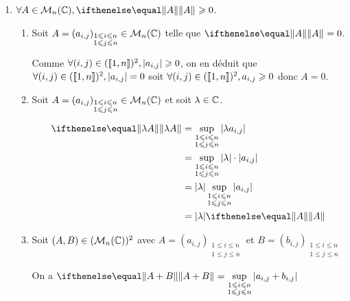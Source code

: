 \begin{enumerate}
    \item $\forall A\in\M_n(\CC),\norme{A}{} \geqslant 0$.
    \begin{enumerate}
        \item Soit $A=\left(a_{i,j}\right)_{\substack{1\leqslant i\leqslant n \\ 1 \leqslant j \leqslant n}}\in\mathcal{M}_n(\mathbb{C})$ telle que $\norme{A}{} = 0$.
        
        Comme $\forall (i,j) \in(\left\llbracket 1, n \right\rrbracket)^2,\vert a_{i,j}\vert \geqslant 0$, on en déduit que $\forall (i,j) \in(\left\llbracket 1, n \right\rrbracket)^2,\vert a_{i,j}\vert = 0$ soit $\forall (i,j) \in(\left\llbracket 1, n \right\rrbracket)^2, a_{i,j} \geqslant 0$ donc $A=0$.
        
        \item Soit $A=\left(a_{i,j}\right)_{\substack{1\leqslant i\leqslant n \\ 1 \leqslant j \leqslant n}}\in\mathcal{M}_n(\mathbb{C})$ et soit $\lambda \in \mathbb{C}$.
        
        \[
            \begin{aligned}
                \norme{\lambda A}{} &= \sup\limits_{\substack{1\leqslant i\leqslant n \\ 1 \leqslant j \leqslant n}} \vert \lambda a_{i,j}\vert\\
                &= \sup\limits_{\substack{1\leqslant i\leqslant n \\ 1 \leqslant j \leqslant n}} \vert\lambda\vert\cdot\vert a_{i,j}\vert\\
                &= \vert\lambda\vert\sup\limits_{\substack{1\leqslant i\leqslant n \\ 1 \leqslant j \leqslant n}}\vert a_{i,j}\vert\\
                &=\vert \lambda \vert \norme{A}{}
            \end{aligned}
        \]
        
        \item Soit $(A,B)\in(\mathcal{M}_n(\mathbb{C}))^2$ avec $A=\left(a_{i,j}\right)_{\substack{1\leqslant i\leqslant n \\ 1 \leqslant j \leqslant n}}$ et $B=\left(b_{i,j}\right)_{\substack{1\leqslant i\leqslant n \\ 1 \leqslant j \leqslant n}}$
        
        On a $\norme{A+B}{} = \sup\limits_{\substack{1\leqslant i\leqslant n \\ 1 \leqslant j \leqslant n}}\vert a_{i,j} +b_{i,j}\vert$
        

\end{enumerate}
\end{enumerate}
